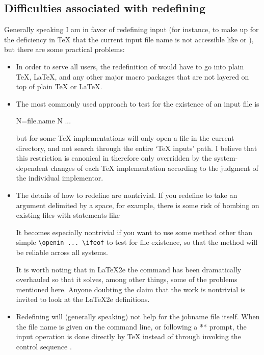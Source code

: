 \subsection{Difficulties associated with redefining }

Generally speaking I am in favor of redefining input (for instance,
to make up for the deficiency in TeX that the current input file name
is not accessible like \cmd{\jobname} or ), but there are
some practical problems:

\begin{itemize}
\item In order to serve all users, the redefinition of \cmd{} would
have to go into plain TeX, LaTeX, and any other major macro
packages that are not layered on top of plain TeX or LaTeX.

\item The most commonly used approach to test for the existence of an input
file is
\begin{lcode}
  \openin N=file.name \ifeof N ...
\end{lcode}
but for
some TeX implementations \cmd{\openin} will only open a file in the
current directory, and not search through the entire `TeX inputs'
path. I believe that this restriction is canonical in 
therefore only overridden by the system-dependent changes of each TeX
implementation according to the judgment of the individual implementor.

\item The details of how to redefine \cmd{} are nontrivial. If you
redefine \cmd{} to take an argument delimited by a space, for
example, there is some risk of bombing on existing files with
statements like
\begin{lcode}
  \relax
\end{lcode}
It becomes especially nontrivial if you want to use some method other
than simple \verb?\openin ... \ifeof? to test for file existence, so that
the method will be reliable across all systems.

It is worth noting that in LaTeX2e the \cmd{} command has
been dramatically overhauled so that it solves, among other things,
some of the problems mentioned here. Anyone doubting the claim that
the work is nontrivial is invited to look at the LaTeX2e definitions.

\item Redefining \cmd{} will (generally speaking) not help for the
jobname file itself. When the file name is given on the command line, or
following a ** prompt, the input operation is done directly by
TeX instead of through invoking the control sequence \cmd{}.


\end{itemize}
